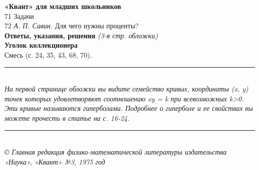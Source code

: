 \documentclass[10pt,a4paper]{article}
\begin{document}
\newline
\hspace*{3ex}\textbf{«Квант» для младших школьников}\\
71 Задачи\\
72 \textit{А. П. Савин.} Для чего нужны проценты?\\
 \textbf{Ответы, указания, решения} \textit{(3-я стр. обложки)}\\
\newline
\hspace*{3ex}\textbf{Уголок коллекционера}\\
\hspace*{3ex}Смесь (с. 24, 35, 43, 68, 70).\\
\begin{spacing}{0.8}
\noindent\rule{10.5cm}{0.4pt}\\
\textit{
На первой странице обложки вы видите семейство кривых, координаты (x, y) точек которых удовлетворяют соотношению xy = k при всевозможных k>0. Эти кривые называются гиперболами. Подробнее о гиперболе и ее свойствах вы можете прочесть в статье на с. 16-24.}\\
\rule{10.5cm}{0.4pt}\\
\textit{
\copyright \hspace*{1ex} Главная редакция физико-математической литературы издательства «Наука», «Квант» №3, 1975 год}
\end{spacing}
\end{document}
